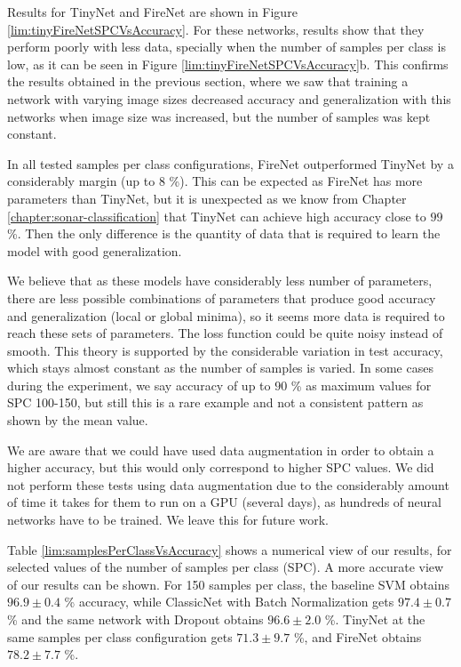 Results for TinyNet and FireNet are shown in Figure \ref{lim:tinyFireNetSPCVsAccuracy}. For these networks, results show that they perform poorly with less data, specially when the number of samples per class is low, as it can be seen in Figure \ref{lim:tinyFireNetSPCVsAccuracy}b. This confirms the results obtained in the previous section, where we saw that training a network with varying image sizes decreased accuracy and generalization with this networks when image size was increased, but the number of samples was kept constant.

In all tested samples per class configurations, FireNet outperformed TinyNet by a considerably margin (up to $8$ \%). This can be expected as FireNet has more parameters than TinyNet, but it is unexpected as we know from Chapter \ref{chapter:sonar-classification} that TinyNet can achieve high accuracy close to $99$ \%. Then the only difference is the quantity of data that is required to learn the model with good generalization.

We believe that as these models have considerably less number of parameters, there are less possible combinations of parameters that produce good accuracy and generalization (local or global minima), so it seems more data is required to reach these sets of parameters. The loss function could be quite noisy instead of smooth. This theory is supported by the considerable variation in test accuracy, which stays almost constant as the number of samples is varied. In some cases during the experiment, we say accuracy of up to $90$ \% as maximum values for SPC 100-150, but still this is a rare example and not a consistent pattern as shown by the mean value.

We are aware that we could have used data augmentation in order to obtain a higher accuracy, but this would only correspond to higher SPC values. We did not perform these tests using data augmentation due to the considerably amount of time it takes for them to run on a GPU (several days), as hundreds of neural networks have to be trained. We leave this for future work.

Table \ref{lim:samplesPerClassVsAccuracy} shows a numerical view of our results, for selected values of the number of samples per class (SPC). A more accurate view of our results can be shown. For 150 samples per class, the baseline SVM obtains $96.9 \pm 0.4$ \% accuracy, while ClassicNet with Batch Normalization gets $97.4 \pm 0.7$ \% and the same network with Dropout obtains $96.6 \pm 2.0$ \%. TinyNet at the same samples per class configuration gets $71.3 \pm 9.7$ \%, and FireNet obtains $78.2 \pm 7.7$ \%.

